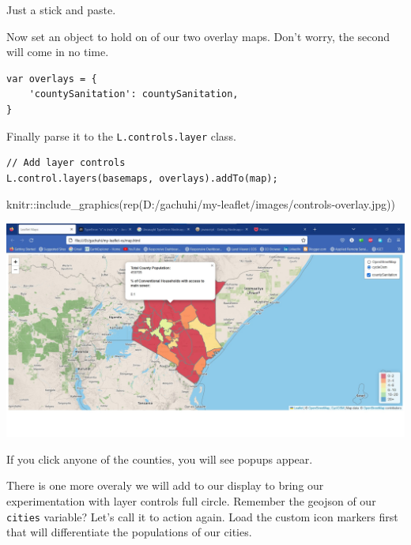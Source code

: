\documentclass[
]{book}
\newenvironment{Shaded}{\begin{snugshade}}{\end{snugshade}}
\newcommand{\FunctionTok}[1]{\textcolor[rgb]{0.00,0.00,0.00}{#1}}
\newcommand{\NormalTok}[1]{#1}
\newcommand{\SpecialCharTok}[1]{\textcolor[rgb]{0.00,0.00,0.00}{#1}}
\newcommand{\StringTok}[1]{\textcolor[rgb]{0.31,0.60,0.02}{#1}}
\begin{document}
Just a stick and paste.

Now set an object to hold on of our two overlay maps. Don't worry, the second will come in no time.

\begin{verbatim}
var overlays = {
    'countySanitation': countySanitation,
}
\end{verbatim}

Finally parse it to the \texttt{L.controls.layer} class.

\begin{verbatim}
// Add layer controls
L.control.layers(basemaps, overlays).addTo(map);
\end{verbatim}

\begin{Shaded}
\begin{Highlighting}[]
\NormalTok{knitr}\SpecialCharTok{::}\FunctionTok{include\_graphics}\NormalTok{(}\FunctionTok{rep}\NormalTok{(}\StringTok{\textquotesingle{}D:/gachuhi/my{-}leaflet/images/controls{-}overlay.jpg\textquotesingle{}}\NormalTok{))}
\end{Highlighting}
\end{Shaded}

\includegraphics[width=26.67in]{../images/controls-overlay}

If you click anyone of the counties, you will see popups appear.

There is one more overaly we will add to our display to bring our experimentation with layer controls full circle. Remember the geojson of our \texttt{cities} variable? Let's call it to action again. Load the custom icon markers first that will differentiate the populations of our cities.
\end{document}
